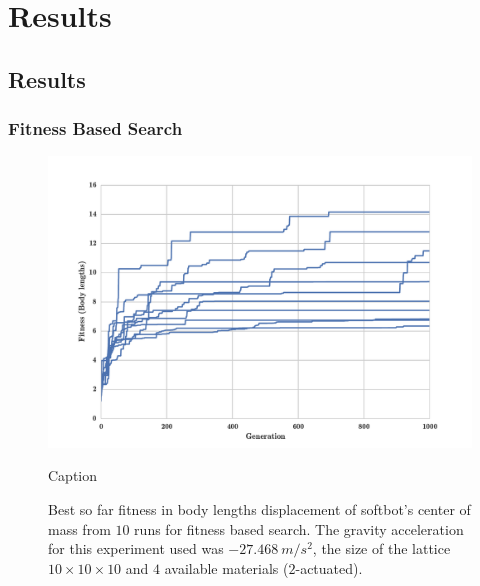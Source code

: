 
\chapter{Results} %

\label{Results} %


\section{Results}

\clearpage
\subsection{Fitness Based Search}

\begin{figure}[h!]
\centering
\includegraphics[width=1.0\textwidth]{../Figures/Results/indRunsSize10Fitness.pdf}
\caption{Caption}
\caption{Best so far fitness in body lengths displacement of softbot's center of mass from $10$ runs for fitness based search. The gravity acceleration for this experiment used was $-27.468\   m/s^2$, the size of the lattice $10\times 10\times10$ and $4$ available materials ($2$-actuated).}
\end{figure}

